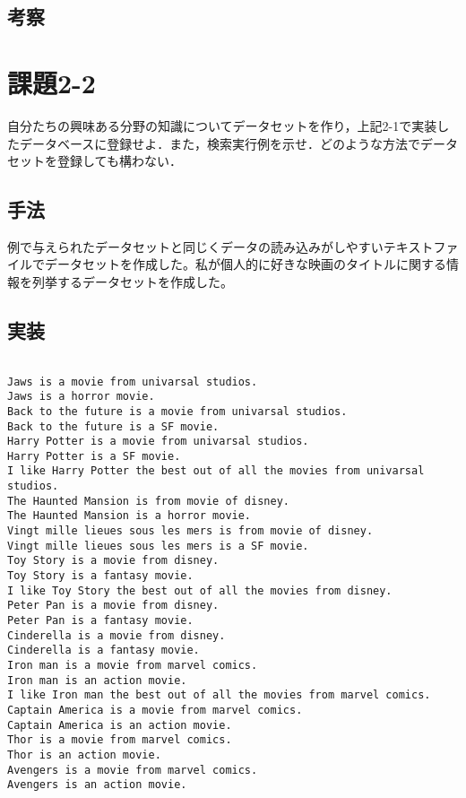 \documentclass[a4j]{jarticle}
\begin{document}
\subsection{考察}


\section{課題2-2}
\begin{screen}
自分たちの興味ある分野の知識についてデータセットを作り，上記2-1で実装したデータベースに登録せよ．また，検索実行例を示せ．どのような方法でデータセットを登録しても構わない．
\end{screen}

\subsection{手法}
例で与えられたデータセットと同じくデータの読み込みがしやすいテキストファイルでデータセットを作成した。私が個人的に好きな映画のタイトルに関する情報を列挙するデータセットを作成した。

\subsection{実装}

\begin{lstlisting}[caption=dataset.txt]

Jaws is a movie from univarsal studios.
Jaws is a horror movie.
Back to the future is a movie from univarsal studios.
Back to the future is a SF movie.
Harry Potter is a movie from univarsal studios.
Harry Potter is a SF movie.
I like Harry Potter the best out of all the movies from univarsal studios.
The Haunted Mansion is from movie of disney.
The Haunted Mansion is a horror movie.
Vingt mille lieues sous les mers is from movie of disney.
Vingt mille lieues sous les mers is a SF movie.
Toy Story is a movie from disney.
Toy Story is a fantasy movie.
I like Toy Story the best out of all the movies from disney.
Peter Pan is a movie from disney.
Peter Pan is a fantasy movie.
Cinderella is a movie from disney.
Cinderella is a fantasy movie.
Iron man is a movie from marvel comics.
Iron man is an action movie.
I like Iron man the best out of all the movies from marvel comics.
Captain America is a movie from marvel comics.
Captain America is an action movie.
Thor is a movie from marvel comics.
Thor is an action movie.
Avengers is a movie from marvel comics.
Avengers is an action movie.

\end{lstlisting}
\end{document}
